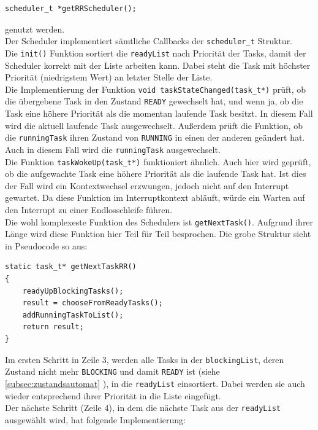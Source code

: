 \documentclass[fontsize=12pt, toc=bibliography, notitlepage]{scrreprt}
\newcommand{\refnn}[1]{\ref{#1} \nameref{#1}}
\begin{document}
\begin{lstlisting}[title=schedulerRR.h]
scheduler_t *getRRScheduler();
\end{lstlisting}

genutzt werden.\\
Der Scheduler implementiert sämtliche Callbacks der \lstinline$scheduler_t$ Struktur.\\
Die \lstinline$init()$ Funktion sortiert die \lstinline$readyList$ nach Priorität der Tasks, damit der Scheduler korrekt mit der Liste arbeiten kann. Dabei steht die Task mit höchster Priorität (niedrigstem Wert) an letzter Stelle der Liste.\\
Die Implementierung der Funktion \lstinline$void taskStateChanged(task_t*)$ prüft, ob die übergebene Task in den Zustand \lstinline$READY$ gewechselt hat, und wenn ja, ob die Task eine höhere Priorität als die momentan laufende Task besitzt. In diesem Fall wird die aktuell laufende Task ausgewechselt. Außerdem prüft die Funktion, ob die \lstinline$runningTask$ ihren Zustand von \lstinline$RUNNING$ in einen der anderen geändert hat. Auch in diesem Fall wird die \lstinline$runningTask$ ausgewechselt.\\
Die Funktion \lstinline$taskWokeUp(task_t*)$ funktioniert ähnlich. Auch hier wird geprüft, ob die aufgewachte Task eine höhere Priorität als die laufende Task hat. Ist dies der Fall wird ein Kontextwechsel erzwungen, jedoch nicht auf den Interrupt gewartet. Da diese Funktion im Interruptkontext abläuft, würde ein Warten auf den Interrupt zu einer Endlosschleife führen.\\
Die wohl komplexeste Funktion des Schedulers ist \lstinline$getNextTask()$. Aufgrund ihrer Länge wird diese Funktion hier Teil für Teil besprochen. Die grobe Struktur sieht in Pseudocode so aus:

\begin{lstlisting}
static task_t* getNextTaskRR()
{
	readyUpBlockingTasks();
	result = chooseFromReadyTasks();
	addRunningTaskToList();
	return result;
}
\end{lstlisting}

Im ersten Schritt in Zeile 3, werden alle Tasks in der \lstinline$blockingList$, deren Zustand nicht mehr \lstinline$BLOCKING$ und damit \lstinline$READY$ ist (siehe \refnn{subsec:zustandsautomat}), in die \lstinline$readyList$ einsortiert. Dabei werden sie auch wieder entsprechend ihrer Priorität in die Liste eingefügt.\\
\newpage
Der nächste Schritt (Zeile 4), in dem die nächste Task aus der \lstinline$readyList$ ausgewählt wird, hat folgende Implementierung:
\end{document}
